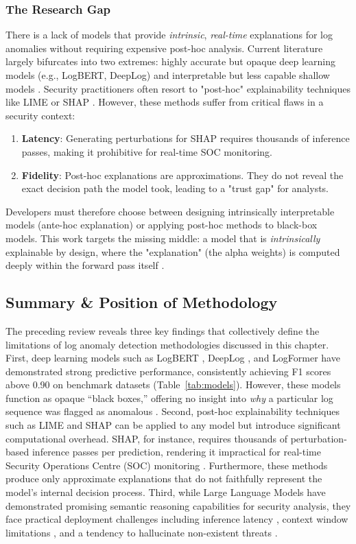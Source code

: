 \subsubsection{The Research Gap} 
There is a lack of models that provide \textit{intrinsic}, \textit{real-time} explanations for log anomalies without requiring expensive post-hoc analysis. Current literature largely bifurcates into two extremes: highly accurate but opaque deep learning models (e.g., LogBERT, DeepLog) and interpretable but less capable shallow models \cite{LogBERT,DeepLog}. Security practitioners often resort to "post-hoc" explainability techniques like LIME or SHAP \cite{SoKBhusal_2023}. However, these methods suffer from critical flaws in a security context: \begin{enumerate} \item \textbf{Latency}: Generating perturbations for SHAP requires thousands of inference passes, making it prohibitive for real-time SOC monitoring. \item \textbf{Fidelity}: Post-hoc explanations are approximations. They do not reveal the exact decision path the model took, leading to a "trust gap" for analysts. \end{enumerate} Developers must therefore choose between designing intrinsically interpretable models (ante-hoc explanation) or applying post-hoc methods to black-box models. This work targets the missing middle: a model that is \textit{intrinsically} explainable by design, where the "explanation" (the alpha weights) is computed deeply within the forward pass itself \cite{SoKBhusal_2023, MLAD}.

\subsection{Summary \& Position of Methodology}

The preceding review reveals three key findings that collectively define the limitations of log anomaly detection methodologies discussed in this chapter. First, deep learning models such as LogBERT \cite{LogBERT}, DeepLog \cite{DeepLog}, and LogFormer \cite{LogFormer} have demonstrated strong predictive performance, consistently achieving F1 scores above 0.90 on benchmark datasets (Table~\ref{tab:models}). However, these models function as opaque ``black boxes,'' offering no insight into \textit{why} a particular log sequence was flagged as anomalous \cite{MLAD}. Second, post-hoc explainability techniques such as LIME \cite{WhyShouldITrustYou} and SHAP \cite{Unified} can be applied to any model but introduce significant computational overhead. SHAP, for instance, requires thousands of perturbation-based inference passes per prediction, rendering it impractical for real-time Security Operations Centre (SOC) monitoring \cite{SoKBhusal_2023}. Furthermore, these methods produce only approximate explanations that do not faithfully represent the model's internal decision process. Third, while Large Language Models have demonstrated promising semantic reasoning capabilities for security analysis, they face practical deployment challenges including inference latency \cite{PreLog}, context window limitations \cite{almodovar-etal-2022-language}, and a tendency to hallucinate non-existent threats \cite{LLMLogAnomaly}.

